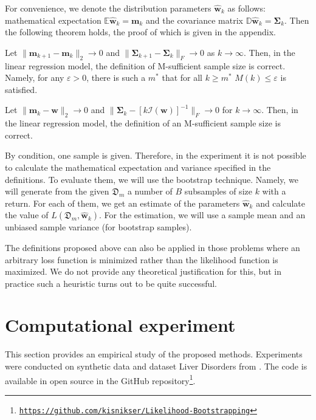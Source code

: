 \documentclass[runningheads]{llncs}
\begin{document}
For convenience, we denote the distribution parameters $\hat{\mathbf{w}}_k$ as follows: mathematical expectation $\mathbb{E}\hat{\mathbf{w}}_k=\mathbf{m}_k$ and the covariance matrix $\mathbb{D} \hat{\mathbf{w}}_k = \mathbf{\Sigma}_k$. Then the following theorem holds, the proof of which is given in the appendix.

\begin{theorem}\label{theorem}
    Let $\|\mathbf{m}_{k+1} - \mathbf{m}_k\|_2 \to 0$ and $\|\mathbf{\Sigma}_{k+1} - \mathbf{\Sigma}_k\|_{F}\to 0$ as $k\to \infty$. Then, in the linear regression model, the definition of M-sufficient sample size is correct. Namely, for any $\varepsilon > 0$, there is such a $m^*$ that for all $k\geqslant m^*$ $M(k)\leqslant\varepsilon$ is satisfied.
\end{theorem}

\begin{corollary}\label{corollary}
    Let $\|\mathbf{m}_k - \mathbf{w}\|_2\to 0$ and $\|\mathbf{\Sigma}_k - \left[k\mathcal{I}(\mathbf{w})\right]^{-1}\|_{F}\to 0$ for $k \to \infty$. Then, in the linear regression model, the definition of an M-sufficient sample size is correct. 
\end{corollary}

By condition, one sample is given. Therefore, in the experiment it is not possible to calculate the mathematical expectation and variance specified in the definitions. To evaluate them, we will use the bootstrap technique. Namely, we will generate from the given $\mathfrak{D}_m$ a number of $B$ subsamples of size $k$ with a return. For each of them, we get an estimate of the parameters $\hat{\mathbf{w}}_{k}$ and calculate the value of $L(\mathfrak{D}_m, \hat{\mathbf{w}}_{k})$. For the estimation, we will use a sample mean and an unbiased sample variance (for bootstrap samples).

The definitions proposed above can also be applied in those problems where an arbitrary loss function is minimized rather than the likelihood function is maximized. We do not provide any theoretical justification for this, but in practice such a heuristic turns out to be quite successful.

\section{Computational experiment}

This section provides an empirical study of the proposed methods. Experiments were conducted on synthetic data and dataset Liver Disorders from \cite{UCI}. The code is available in open source in the GitHub repository\footnote{\href{https://github.com/kisnikser/Likelihood-Bootstrapping}{\texttt{https://github.com/kisnikser/Likelihood-Bootstrapping}}}.
\end{document}
